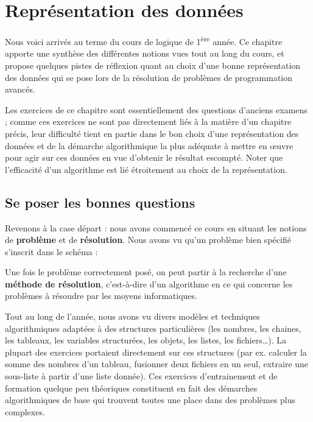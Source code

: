 \chapter{Représentation des données}


Nous voici arrivés au terme du cours de logique de
1\textsuperscript{ère} année. Ce chapitre apporte une synthèse des
différentes notions vues tout au long du cours, et propose quelques
pistes de réflexion quant au choix d’une bonne représentation des
données qui se pose lors de la résolution de problèmes de programmation
avancés.

Les exercices de ce chapitre sont essentiellement des questions
d’anciens examens ; comme ces exercices ne sont pas directement liés à
la matière d’un chapitre précis, leur difficulté tient en partie dans
le bon choix d’une représentation des données et de la démarche
algorithmique la plus adéquate à mettre en œuvre pour agir sur ces
données en vue d’obtenir le résultat escompté. Noter que l’efficacité
d’un algorithme est lié étroitement au choix de la représentation.


\section{Se poser les bonnes questions}

Revenons à la case départ : nous avons commencé ce cours en situant les
notions de \textbf{problème} et de \textbf{résolution}. Nous avons vu
qu’un problème bien spécifié s’inscrit dans le schéma :


Une fois le problème correctement posé, on peut partir à la recherche
d’une \textbf{méthode de résolution}, c’est-à-dire d’un algorithme en
ce qui concerne les problèmes à résoudre par les moyens informatiques.

Tout au long de l’année, nous avons vu divers modèles et techniques
algorithmiques adaptées à des structures particulières (les nombres,
les chaines, les tableaux, les variables structurées, les objets, les
listes, les fichiers…). La plupart des exercices portaient directement
sur ces structures (par ex. calculer la somme des nombres d’un tableau,
fusionner deux fichiers en un seul, extraire une sous-liste à partir
d’une liste donnée). Ces exercices d’entrainement et de formation
quelque peu théoriques constituent en fait des démarches algorithmiques
de base qui trouvent toutes une place dans des problèmes plus
complexes.

